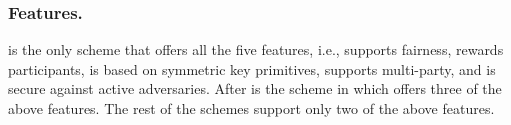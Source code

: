 \vs
\vs
\subsubsection{Features.} \epsi is the only scheme that offers all the five features, i.e., supports fairness, rewards participants, is based on symmetric key primitives, supports multi-party, and is secure against active adversaries. After \epsi is the scheme in \cite{NevoTY21} which offers three of the above features. The rest of the schemes support only two of the above features. 








